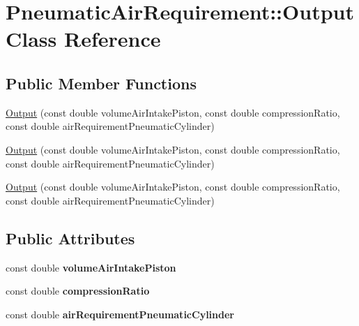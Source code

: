 \hypertarget{class_pneumatic_air_requirement_1_1_output}{}\section{Pneumatic\+Air\+Requirement\+:\+:Output Class Reference}
\label{class_pneumatic_air_requirement_1_1_output}
\subsection*{Public Member Functions}
\begin{DoxyCompactItemize}
\item 
\hyperlink{class_pneumatic_air_requirement_1_1_output_a69397f777ea0aed4b9d3a913883c8a10}{Output} (const double volume\+Air\+Intake\+Piston, const double compression\+Ratio, const double air\+Requirement\+Pneumatic\+Cylinder)
\item 
\hyperlink{class_pneumatic_air_requirement_1_1_output_a69397f777ea0aed4b9d3a913883c8a10}{Output} (const double volume\+Air\+Intake\+Piston, const double compression\+Ratio, const double air\+Requirement\+Pneumatic\+Cylinder)
\item 
\hyperlink{class_pneumatic_air_requirement_1_1_output_a69397f777ea0aed4b9d3a913883c8a10}{Output} (const double volume\+Air\+Intake\+Piston, const double compression\+Ratio, const double air\+Requirement\+Pneumatic\+Cylinder)
\end{DoxyCompactItemize}
\subsection*{Public Attributes}
\begin{DoxyCompactItemize}
\item 
\mbox{\label{class_pneumatic_air_requirement_1_1_output_a051ec4d07978c023ba852396e4ae0d0d}} 
const double {\bfseries volume\+Air\+Intake\+Piston}
\item 
\mbox{\label{class_pneumatic_air_requirement_1_1_output_acbf96b686e7226c6c1c5d81b4620c5d8}} 
const double {\bfseries compression\+Ratio}
\item 
\mbox{\label{class_pneumatic_air_requirement_1_1_output_a90c33f92f3f215f0b2699ce96f5e845c}} 
const double {\bfseries air\+Requirement\+Pneumatic\+Cylinder}
\end{DoxyCompactItemize}



